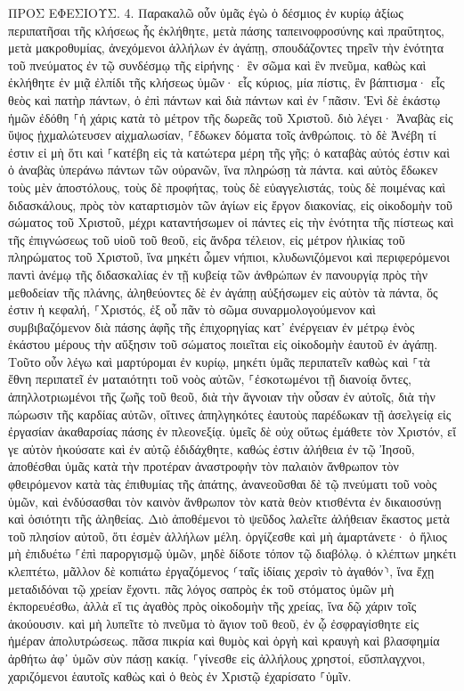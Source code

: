\documentclass[twoside, 9pt]{extreport}
\begin{document}
ΠΡΟΣ ΕΦΕΣΙΟΥΣ.
4.
Παρακαλῶ οὖν ὑμᾶς ἐγὼ ὁ δέσμιος ἐν κυρίῳ ἀξίως περιπατῆσαι τῆς κλήσεως ἧς ἐκλήθητε, 
μετὰ πάσης ταπεινοφροσύνης καὶ πραΰτητος, μετὰ μακροθυμίας, ἀνεχόμενοι ἀλλήλων ἐν ἀγάπῃ, 
σπουδάζοντες τηρεῖν τὴν ἑνότητα τοῦ πνεύματος ἐν τῷ συνδέσμῳ τῆς εἰρήνης· 
ἓν σῶμα καὶ ἓν πνεῦμα, καθὼς καὶ ἐκλήθητε ἐν μιᾷ ἐλπίδι τῆς κλήσεως ὑμῶν· 
εἷς κύριος, μία πίστις, ἓν βάπτισμα· 
εἷς θεὸς καὶ πατὴρ πάντων, ὁ ἐπὶ πάντων καὶ διὰ πάντων καὶ ἐν ⸀πᾶσιν. 
Ἑνὶ δὲ ἑκάστῳ ἡμῶν ἐδόθη ⸀ἡ χάρις κατὰ τὸ μέτρον τῆς δωρεᾶς τοῦ Χριστοῦ. 
διὸ λέγει· Ἀναβὰς εἰς ὕψος ᾐχμαλώτευσεν αἰχμαλωσίαν, ⸀ἔδωκεν δόματα τοῖς ἀνθρώποις. 
τὸ δὲ Ἀνέβη τί ἐστιν εἰ μὴ ὅτι καὶ ⸀κατέβη εἰς τὰ κατώτερα μέρη τῆς γῆς; 
ὁ καταβὰς αὐτός ἐστιν καὶ ὁ ἀναβὰς ὑπεράνω πάντων τῶν οὐρανῶν, ἵνα πληρώσῃ τὰ πάντα. 
καὶ αὐτὸς ἔδωκεν τοὺς μὲν ἀποστόλους, τοὺς δὲ προφήτας, τοὺς δὲ εὐαγγελιστάς, τοὺς δὲ ποιμένας καὶ διδασκάλους, 
πρὸς τὸν καταρτισμὸν τῶν ἁγίων εἰς ἔργον διακονίας, εἰς οἰκοδομὴν τοῦ σώματος τοῦ Χριστοῦ, 
μέχρι καταντήσωμεν οἱ πάντες εἰς τὴν ἑνότητα τῆς πίστεως καὶ τῆς ἐπιγνώσεως τοῦ υἱοῦ τοῦ θεοῦ, εἰς ἄνδρα τέλειον, εἰς μέτρον ἡλικίας τοῦ πληρώματος τοῦ Χριστοῦ, 
ἵνα μηκέτι ὦμεν νήπιοι, κλυδωνιζόμενοι καὶ περιφερόμενοι παντὶ ἀνέμῳ τῆς διδασκαλίας ἐν τῇ κυβείᾳ τῶν ἀνθρώπων ἐν πανουργίᾳ πρὸς τὴν μεθοδείαν τῆς πλάνης, 
ἀληθεύοντες δὲ ἐν ἀγάπῃ αὐξήσωμεν εἰς αὐτὸν τὰ πάντα, ὅς ἐστιν ἡ κεφαλή, ⸀Χριστός, 
ἐξ οὗ πᾶν τὸ σῶμα συναρμολογούμενον καὶ συμβιβαζόμενον διὰ πάσης ἁφῆς τῆς ἐπιχορηγίας κατ᾽ ἐνέργειαν ἐν μέτρῳ ἑνὸς ἑκάστου μέρους τὴν αὔξησιν τοῦ σώματος ποιεῖται εἰς οἰκοδομὴν ἑαυτοῦ ἐν ἀγάπῃ. 
Τοῦτο οὖν λέγω καὶ μαρτύρομαι ἐν κυρίῳ, μηκέτι ὑμᾶς περιπατεῖν καθὼς καὶ ⸀τὰ ἔθνη περιπατεῖ ἐν ματαιότητι τοῦ νοὸς αὐτῶν, 
⸀ἐσκοτωμένοι τῇ διανοίᾳ ὄντες, ἀπηλλοτριωμένοι τῆς ζωῆς τοῦ θεοῦ, διὰ τὴν ἄγνοιαν τὴν οὖσαν ἐν αὐτοῖς, διὰ τὴν πώρωσιν τῆς καρδίας αὐτῶν, 
οἵτινες ἀπηλγηκότες ἑαυτοὺς παρέδωκαν τῇ ἀσελγείᾳ εἰς ἐργασίαν ἀκαθαρσίας πάσης ἐν πλεονεξίᾳ. 
ὑμεῖς δὲ οὐχ οὕτως ἐμάθετε τὸν Χριστόν, 
εἴ γε αὐτὸν ἠκούσατε καὶ ἐν αὐτῷ ἐδιδάχθητε, καθώς ἐστιν ἀλήθεια ἐν τῷ Ἰησοῦ, 
ἀποθέσθαι ὑμᾶς κατὰ τὴν προτέραν ἀναστροφὴν τὸν παλαιὸν ἄνθρωπον τὸν φθειρόμενον κατὰ τὰς ἐπιθυμίας τῆς ἀπάτης, 
ἀνανεοῦσθαι δὲ τῷ πνεύματι τοῦ νοὸς ὑμῶν, 
καὶ ἐνδύσασθαι τὸν καινὸν ἄνθρωπον τὸν κατὰ θεὸν κτισθέντα ἐν δικαιοσύνῃ καὶ ὁσιότητι τῆς ἀληθείας. 
Διὸ ἀποθέμενοι τὸ ψεῦδος λαλεῖτε ἀλήθειαν ἕκαστος μετὰ τοῦ πλησίον αὐτοῦ, ὅτι ἐσμὲν ἀλλήλων μέλη. 
ὀργίζεσθε καὶ μὴ ἁμαρτάνετε· ὁ ἥλιος μὴ ἐπιδυέτω ⸀ἐπὶ παροργισμῷ ὑμῶν, 
μηδὲ δίδοτε τόπον τῷ διαβόλῳ. 
ὁ κλέπτων μηκέτι κλεπτέτω, μᾶλλον δὲ κοπιάτω ἐργαζόμενος ⸂ταῖς ἰδίαις χερσὶν τὸ ἀγαθόν⸃, ἵνα ἔχῃ μεταδιδόναι τῷ χρείαν ἔχοντι. 
πᾶς λόγος σαπρὸς ἐκ τοῦ στόματος ὑμῶν μὴ ἐκπορευέσθω, ἀλλὰ εἴ τις ἀγαθὸς πρὸς οἰκοδομὴν τῆς χρείας, ἵνα δῷ χάριν τοῖς ἀκούουσιν. 
καὶ μὴ λυπεῖτε τὸ πνεῦμα τὸ ἅγιον τοῦ θεοῦ, ἐν ᾧ ἐσφραγίσθητε εἰς ἡμέραν ἀπολυτρώσεως. 
πᾶσα πικρία καὶ θυμὸς καὶ ὀργὴ καὶ κραυγὴ καὶ βλασφημία ἀρθήτω ἀφ᾽ ὑμῶν σὺν πάσῃ κακίᾳ. 
⸀γίνεσθε εἰς ἀλλήλους χρηστοί, εὔσπλαγχνοι, χαριζόμενοι ἑαυτοῖς καθὼς καὶ ὁ θεὸς ἐν Χριστῷ ἐχαρίσατο ⸀ὑμῖν. 
\end{document}
